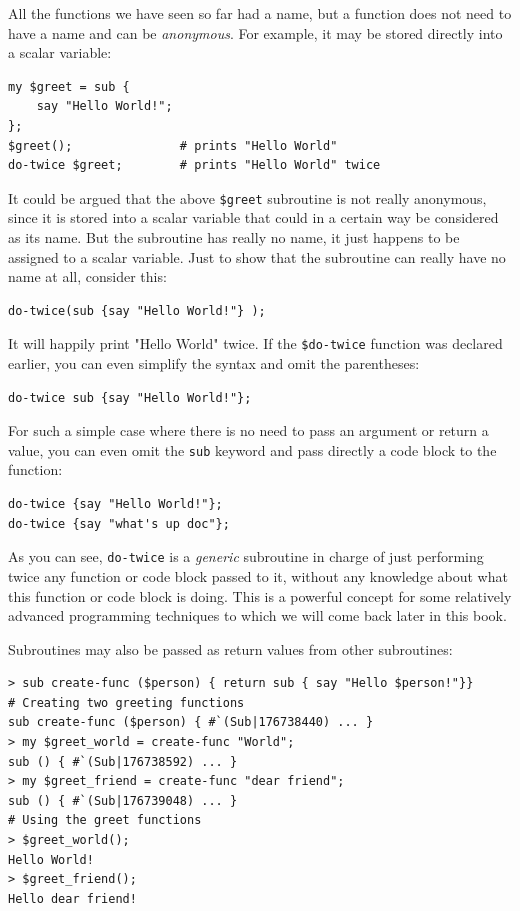 All the functions we have seen so far had a name, but a 
function does not need to have a name and can be \emph{anonymous}. 
For example, it may be stored directly into a scalar variable:

\begin{verbatim}
my $greet = sub {
    say "Hello World!";
};
$greet();               # prints "Hello World"
do-twice $greet;        # prints "Hello World" twice
\end{verbatim}

It could be argued that the above \verb"$greet" subroutine  
is not really anonymous, since it is stored into a scalar 
variable that could in a certain way be considered as its name. 
But the subroutine has really no name, it just happens to be 
assigned to a scalar variable. Just to show that the subroutine 
can really have no name at all, consider this:

\begin{verbatim}
do-twice(sub {say "Hello World!"} );
\end{verbatim}

It will happily print "Hello World" twice. If the \verb"$do-twice"
function was declared earlier, you can even simplify the syntax 
and omit the parentheses:

\begin{verbatim}
do-twice sub {say "Hello World!"};
\end{verbatim}

For such a simple case where there is no need to pass an 
argument or return a value, you can even omit the 
\verb"sub" keyword and pass directly a code block to the function:

\begin{verbatim}
do-twice {say "Hello World!"};
do-twice {say "what's up doc"};
\end{verbatim}

As you can see, \verb"do-twice" is a \emph{generic} subroutine in 
charge of just performing twice any function or code 
block passed to it, without any knowledge about what 
this function or code block is doing. This is a powerful 
concept for some relatively advanced programming techniques to 
which we will come back later in this book.

Subroutines may also be passed as return values from other 
subroutines:

\begin{verbatim}
> sub create-func ($person) { return sub { say "Hello $person!"}}
# Creating two greeting functions
sub create-func ($person) { #`(Sub|176738440) ... }
> my $greet_world = create-func "World";
sub () { #`(Sub|176738592) ... }
> my $greet_friend = create-func "dear friend";
sub () { #`(Sub|176739048) ... }
# Using the greet functions
> $greet_world();
Hello World!
> $greet_friend();
Hello dear friend!
\end{verbatim} 

